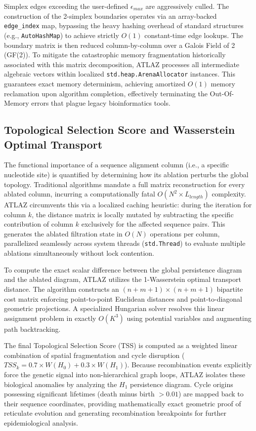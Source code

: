 Simplex edges exceeding the user-defined $\epsilon_{max}$ are aggressively culled. The construction of the 2-simplex boundaries operates via an array-backed \texttt{edge\_index} map, bypassing the heavy hashing overhead of standard structures (e.g., \texttt{AutoHashMap}) to achieve strictly $O(1)$ constant-time edge lookups. The boundary matrix is then reduced column-by-column over a Galois Field of 2 (GF(2)). To mitigate the catastrophic memory fragmentation historically associated with this matrix decomposition, ATLAZ processes all intermediate algebraic vectors within localized \texttt{std.heap.ArenaAllocator} instances. This guarantees exact memory determinism, achieving amortized $O(1)$ memory reclamation upon algorithm completion, effectively terminating the Out-Of-Memory errors that plague legacy bioinformatics tools.

\subsection{Topological Selection Score and Wasserstein Optimal Transport}
The functional importance of a sequence alignment column (i.e., a specific nucleotide site) is quantified by determining how its ablation perturbs the global topology. Traditional algorithms mandate a full matrix reconstruction for every ablated column, incurring a computationally fatal $O(N^2 \times L_{length})$ complexity. ATLAZ circumvents this via a localized caching heuristic: during the iteration for column $k$, the distance matrix is locally mutated by subtracting the specific contribution of column $k$ exclusively for the affected sequence pairs. This generates the ablated filtration state in $O(N)$ operations per column, parallelized seamlessly across system threads (\texttt{std.Thread}) to evaluate multiple ablations simultaneously without lock contention.

To compute the exact scalar difference between the global persistence diagram and the ablated diagram, ATLAZ utilizes the 1-Wasserstein optimal transport distance. The algorithm constructs an $(n+m+1) \times (n+m+1)$ bipartite cost matrix enforcing point-to-point Euclidean distances and point-to-diagonal geometric projections. A specialized Hungarian solver resolves this linear assignment problem in exactly $O(K^3)$ using potential variables and augmenting path backtracking.

The final Topological Selection Score (TSS) is computed as a weighted linear combination of spatial fragmentation and cycle disruption ($TSS_k = 0.7 \times W(H_0) + 0.3 \times W(H_1)$). Because recombination events explicitly force the genetic signal into non-hierarchical graph loops, ATLAZ isolates these biological anomalies by analyzing the $H_1$ persistence diagram. Cycle origins possessing significant lifetimes (death minus birth $> 0.01$) are mapped back to their sequence coordinates, providing mathematically exact geometric proof of reticulate evolution and generating recombination breakpoints for further epidemiological analysis.
